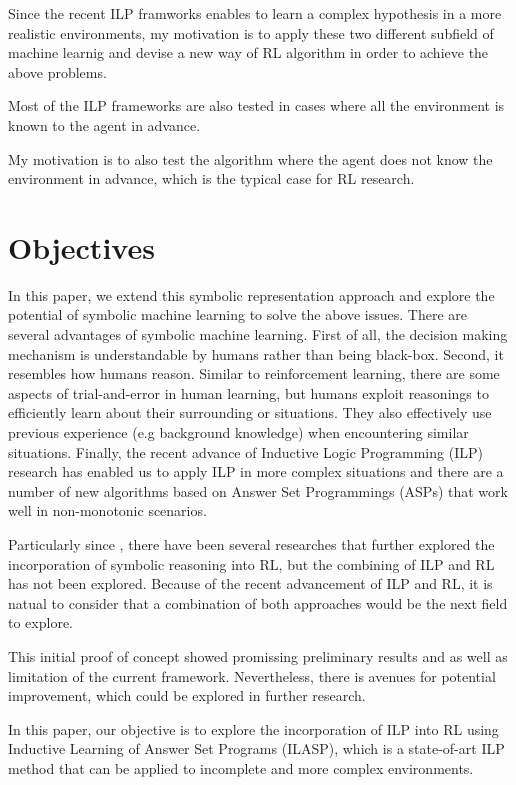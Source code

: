 Since the recent ILP framworks enables to learn a complex hypothesis in a more realistic environments, 
my motivation is to apply these two different subfield of machine learnig and devise a new way of RL algorithm in order to achieve the above problems.

Most of the ILP frameworks are also tested in cases where all the environment is known to the agent in advance. 

My motivation is to also test the algorithm where the agent does not know the environment in advance, which is the typical case for RL research.

\section{Objectives}
\label{sec:objectives}

In this paper, we extend this symbolic representation approach and explore the potential of symbolic machine learning to solve the above issues. 
There are several advantages of symbolic machine learning. First of all, the decision making mechanism is understandable by humans rather than being black-box.
Second, it resembles how humans reason. Similar to reinforcement learning, there are some aspects of trial-and-error in human learning, but humans exploit reasonings to efficiently learn about their surrounding or situations. 
They also effectively use previous experience (e.g background knowledge) when encountering similar situations.
Finally, the recent advance of Inductive Logic Programming (ILP) research has enabled us to apply ILP in more complex situations and there are a number of new algorithms based on Answer Set Programmings (ASPs) that work well in non-monotonic scenarios.

Particularly since \cite{Garnelo2016}, there have been several researches that further explored the incorporation of symbolic reasoning into RL, but the combining of ILP and RL has not been explored. 
Because of the recent advancement of ILP and RL, it is natual to consider that a combination of both approaches would be the next field to explore.

This initial proof of concept showed promissing preliminary results and as well as limitation of the current framework. 
Nevertheless, there is avenues for potential improvement, which could be explored in further research.

In this paper, our objective is to  explore the incorporation of ILP into RL using Inductive Learning of Answer Set Programs (ILASP), which is a state-of-art ILP method that can be applied to incomplete and more complex environments.

